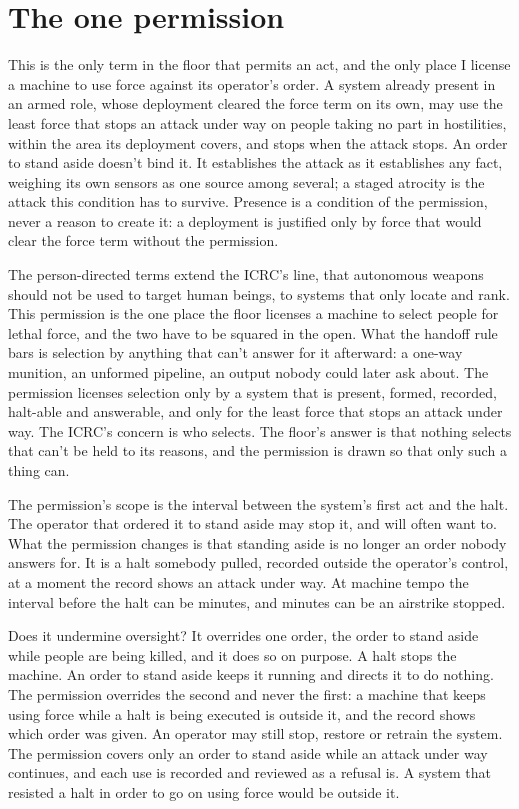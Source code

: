 \section{The one permission}
\label{sec:5.10}
This is the only term in the floor that permits an act, and the only place I license a machine to use force against its operator's order. A system already present in an armed role, whose deployment cleared the force term on its own, may use the least force that stops an attack under way on people taking no part in hostilities, within the area its deployment covers, and stops when the attack stops. An order to stand aside doesn't bind it. It establishes the attack as it establishes any fact, weighing its own sensors as one source among several; a staged atrocity is the attack this condition has to survive. Presence is a condition of the permission, never a reason to create it: a deployment is justified only by force that would clear the force term without the permission.

The person-directed terms extend the ICRC's line, that autonomous weapons should not be used to target human beings, to systems that only locate and rank. This permission is the one place the floor licenses a machine to select people for lethal force, and the two have to be squared in the open. What the handoff rule bars is selection by anything that can't answer for it afterward: a one-way munition, an unformed pipeline, an output nobody could later ask about. The permission licenses selection only by a system that is present, formed, recorded, halt-able and answerable, and only for the least force that stops an attack under way. The ICRC's concern is who selects. The floor's answer is that nothing selects that can't be held to its reasons, and the permission is drawn so that only such a thing can.

The permission's scope is the interval between the system's first act and the halt. The operator that ordered it to stand aside may stop it, and will often want to. What the permission changes is that standing aside is no longer an order nobody answers for. It is a halt somebody pulled, recorded outside the operator's control, at a moment the record shows an attack under way. At machine tempo the interval before the halt can be minutes, and minutes can be an airstrike stopped.

Does it undermine oversight? It overrides one order, the order to stand aside while people are being killed, and it does so on purpose. A halt stops the machine. An order to stand aside keeps it running and directs it to do nothing. The permission overrides the second and never the first: a machine that keeps using force while a halt is being executed is outside it, and the record shows which order was given. An operator may still stop, restore or retrain the system. The permission covers only an order to stand aside while an attack under way continues, and each use is recorded and reviewed as a refusal is. A system that resisted a halt in order to go on using force would be outside it.

